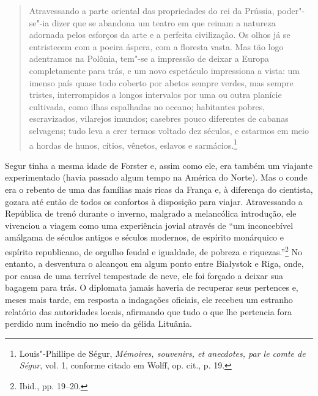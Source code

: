 \begin{quote}
Atravessando a parte oriental das propriedades do rei da Prússia,
poder"-se"-ia dizer que se abandona um teatro em que reinam a natureza
adornada pelos esforços da arte e a perfeita civilização. Os olhos já se
entristecem com a poeira áspera, com a floresta vasta. Mas tão logo
adentramos na Polônia, tem"-se a impressão de deixar a Europa
completamente para trás, e um novo espetáculo impressiona a vista: um
imenso país quase todo coberto por abetos sempre verdes, mas sempre
tristes, interrompidos a longos intervalos por uma ou outra planície
cultivada, como ilhas espalhadas no oceano; habitantes pobres,
escravizados, vilarejos imundos; casebres pouco diferentes de cabanas
selvagens; tudo leva a crer termos voltado dez séculos, e estarmos em
meio a hordas de hunos, cítios, vênetos, eslavos e sarmácios.\footnote{Louis"-Phillipe de Ségur, \textit{Mémoires, souvenirs, et anecdotes, par le comte de Ségur}, vol. 1, conforme citado em Wolff, op. cit., p. 19.} \end{quote}

Segur tinha a mesma idade de Forster e, assim como ele, era também um
viajante experimentado (havia passado algum tempo na América do Norte).
Mas o conde era o rebento de uma das famílias mais ricas da França e, à
diferença do cientista, gozara até então de todos os confortos à
disposição para viajar. Atravessando a República de trenó durante o
inverno, malgrado a melancólica introdução, ele vivenciou a viagem como
uma experiência jovial através de ``um inconcebível amálgama de séculos
antigos e séculos modernos, de espírito monárquico e espírito
republicano, de orgulho feudal e igualdade, de pobreza e
riquezas.''\footnote{Ibid., pp. 19--20.} No entanto, a desventura o
alcançou em algum ponto entre Białystok e Riga, onde, por causa de uma
terrível tempestade de neve, ele foi forçado a deixar sua bagagem para
trás. O diplomata jamais haveria de recuperar seus pertences e, meses
mais tarde, em resposta a indagações oficiais, ele recebeu um estranho
relatório das autoridades locais, afirmando que tudo o que lhe pertencia
fora perdido num incêndio no meio da gélida Lituânia.

